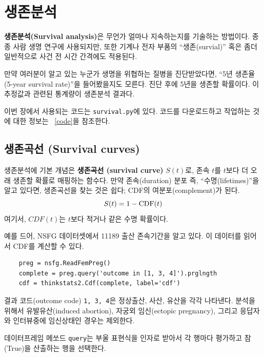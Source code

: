
\chapter{생존분석}

{\bf 생존분석(Survival analysis)}은 무언가 얼마나 지속하는지를 기술하는 방법이다. 종종 사람 생명 연구에 사용되지만, 또한 기계나 전자 부품의 ``생존(survial)'' 혹은 좀더 일반적으로 사건 전 시간 간격에도 적용된다.

만약 여러분이 알고 있는 누군가 생명을 위협하는 질병을 진단받았다면, ``5년 생존율 (5-year survival rate)''을 들어봤을지도 모른다. 진단 후에 5년을 생존할 확률이다. 이 추정값과 관련된 통계량이 생존분석 결과다.

이번 장에서 사용되는 코드는 {\tt survival.py}에 있다.
코드를 다운로드하고 작업하는 것에 대한 정보는 ~\ref{code}을 참조한다.


\section{생존곡선 (Survival curves)}
\label{survival}

생존분석에 기본 개념은 {\bf 생존곡선 (survival curve)} $S(t)$로,
존속 $t$를 $t$보다 더 오래 생존할 확률로 매핑하는 함수다.
만약 존속(duration) 분포 즉, ``수명(lifetimes)''을 알고 있다면,
생존곡선을 찾는 것은 쉽다; CDF의 여분포(complement)가 된다.
%
\[ S(t) = 1 - \mathrm{CDF}(t) \]
%
여기서, $CDF(t)$는 $t$보다 적거나 같은 수명 확률이다.

예를 드어, NSFG 데이터셋에서 11189 출산 존속기간을 알고 있다.
이 데이터를 읽어서 CDF를 계산할 수 있다.

\begin{verbatim}
    preg = nsfg.ReadFemPreg()
    complete = preg.query('outcome in [1, 3, 4]').prglngth
    cdf = thinkstats2.Cdf(complete, label='cdf')
\end{verbatim}

결과 코드(outcome code) {\tt 1, 3, 4}은 정상출산, 사산, 유산을 각각 나타낸다.
분석을 위해서 유발유산(induced abortion), 자궁외 임신(ectopic pregnancy), 그리고 응답자와 인터뷰중에 임신상태인 경우는 제외한다.

데이터프레임 메쏘드 {\tt query}는 부울 표현식을 인자로 받아서 각 행마다 평가하고 참(True)을 산출하는 행을 선택한다.

